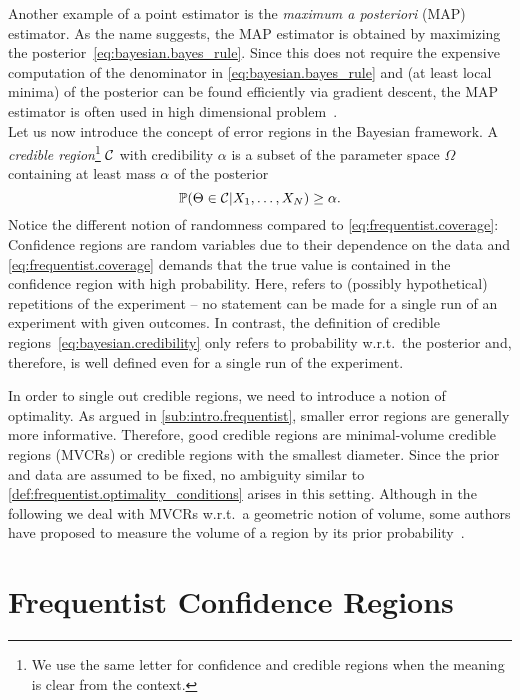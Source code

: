 Another example of a point estimator is the \emph{maximum a posteriori} (MAP) estimator.
As the name suggests, the MAP estimator is obtained by maximizing the posterior~\eqref{eq:bayesian.bayes_rule}.
Since this does not require the expensive computation of the denominator in \cref{eq:bayesian.bayes_rule} and (at least local minima) of the posterior can be found efficiently via gradient descent, the MAP estimator is often used in high dimensional problem~\cite{Murphy_2012_Machine}.\\


Let us now introduce the concept of error regions in the Bayesian framework.
A \emph{credible region}\footnote{%
  We use the same letter for confidence and credible regions when the meaning is clear from the context.
}
$\mathcal{C}$ with credibility $\alpha$ is a subset of the parameter space $\Omega$ containing at least mass $\alpha$ of the posterior
\[
  \label{eq:bayesian.credibility}
  \mathbb{P}(\Theta \in \mathcal{C} | X_1, \ldots, X_N) \ge \alpha.
\]
Notice the different notion of randomness compared to \cref{eq:frequentist.coverage}:
Confidence regions are random variables due to their dependence on the data and \cref{eq:frequentist.coverage} demands that the true value is contained in the confidence region with high probability.
Here,  refers to (possibly hypothetical) repetitions of the experiment -- no statement can be made for a single run of an experiment with given outcomes.
In contrast, the definition of credible regions~\eqref{eq:bayesian.credibility} only refers to probability w.r.t.\ the posterior and, therefore, is well defined even for a single run of the experiment.

In order to single out  credible regions, we need to introduce a notion of optimality.
As argued in \cref{sub:intro.frequentist}, smaller error regions are generally more informative.
Therefore, good credible regions are minimal-volume credible regions (MVCRs) or credible regions with the smallest diameter.
Since the prior and data are  assumed to be fixed, no ambiguity similar to \cref{def:frequentist.optimality_conditions} arises in this setting.
Although in the following we deal with MVCRs w.r.t.\ a geometric notion of volume, some authors have proposed to measure the volume of a region by its prior probability~\cite{Evans_2006_Optimally,Shang_2013_Optimal}.





\section{Frequentist Confidence Regions}
\label{sec:error.frequentist}

